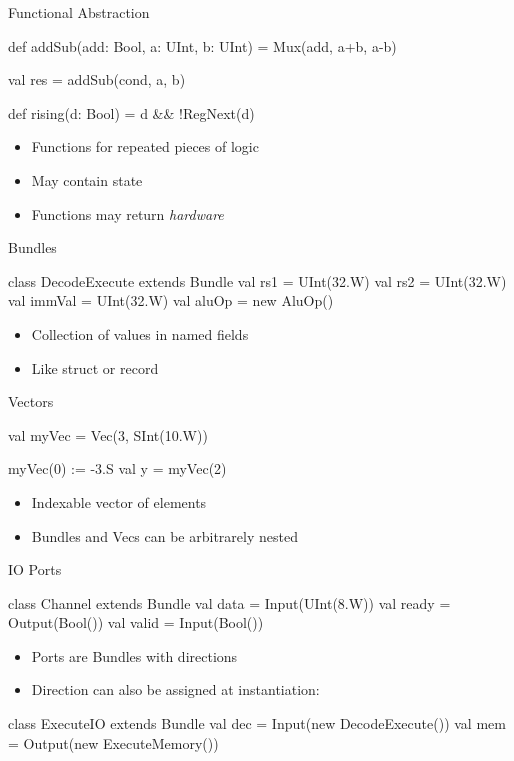 \documentclass[xcolor=pdflatex,dvipsnames,table]{beamer}
\begin{document}
\begin{frame}[fragile]{Functional Abstraction}
\begin{chisel}
  def addSub(add: Bool, a: UInt, b: UInt) =
    Mux(add, a+b, a-b)

  val res = addSub(cond, a, b)
  
  def rising(d: Bool) = d && !RegNext(d)
\end{chisel}
\begin{itemize}
\item Functions for repeated pieces of logic
\item May contain state
\item Functions may return \emph{hardware}
\end{itemize}
\end{frame}


\begin{frame}[fragile]{Bundles}
\begin{chisel}
class DecodeExecute extends Bundle {
  val rs1 = UInt(32.W)
  val rs2 = UInt(32.W)
  val immVal = UInt(32.W)
  val aluOp = new AluOp()
}
\end{chisel}
\begin{itemize}
\item Collection of values in named fields 
\item Like struct or record
\end{itemize}
\end{frame}

\begin{frame}[fragile]{Vectors}
\begin{chisel}
val myVec = Vec(3, SInt(10.W))

myVec(0) := -3.S
val y = myVec(2)
\end{chisel}
\begin{itemize}
\item Indexable vector of elements
\item Bundles and Vecs can be arbitrarely nested
\end{itemize}
\end{frame}

\begin{frame}[fragile]{IO Ports}
\begin{chisel}
class Channel extends Bundle {
  val data = Input(UInt(8.W))
  val ready = Output(Bool())
  val valid = Input(Bool())
}
\end{chisel}
\begin{itemize}
\item Ports are Bundles with directions
\item Direction can also be assigned at instantiation:
\end{itemize}
\begin{chisel}
class ExecuteIO extends Bundle {
  val dec = Input(new DecodeExecute())
  val mem = Output(new ExecuteMemory())
}
\end{chisel}
\end{frame}
\end{document}
